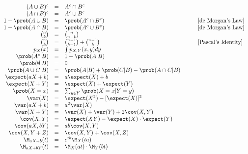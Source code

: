 \documentclass[11pt,a4paper]{article}
\begin{document}
\[
\begin{array}{rclcl}
  (A\cup B)^c&=&A^c\cap B^c&\quad\\
  (A\cap B)^c&=&A^c\cup B^c\\
  1-\prob(A\cup B)&=&\prob(A^c\cap B^c)&&[\text{de Morgan's Law}]\\
  1-\prob(A\cap B)&=&\prob(A^c\cup B^c)&&[\text{de Morgan's Law}]\\
  {n \choose k}&=&{n \choose n-k}\\
  {n \choose k}&=&{n-1 \choose k-1}+{n-1 \choose k}&&[\text{Pascal's Identity}]\\
  p_X(x)&=&\int p_{X,Y}(x,y)dy\\
  \prob(A^c|B)&=&1-\prob(A|B)\\
  \prob(\emptyset|B)&=&0\\
  \prob(A\cup C|B)&=&\prob(A|B)+\prob(C|B)-\prob(A\cap C|B)\\
  \expect(aX+b)&=&a\expect(X)+b\\
  \expect(X+Y)&=&\expect(X)+\expect(Y)\\
  \prob(X=x)&=&\sum_{y\in Y}\prob(X=x|Y=y)\\
  \var(X)&=&\expect(X^2)-[\expect(X)]^2\\
  \var(aX+b)&=&a^2\var(X)\\
  \var(X+Y)&=&\var(X)+\var(Y)+2\cov(X,Y)\\
  \cov(X,Y)&=&\expect(XY)-\expect(X)\cdot\expect(Y)\\
  \cov(aX,bY)&=&ab\cov(X,Y)\\
  \cov(X,Y+Z)&=&\cov(X,Y)+\cov(X,Z)\\
  \M_{aX+b}(t)&=&e^{tb}\M_X(ta)\\
  \M_{aX+bY}(t)&=&\M_X(at)\cdot\M_Y(bt)
\end{array}
\]
\end{document}
